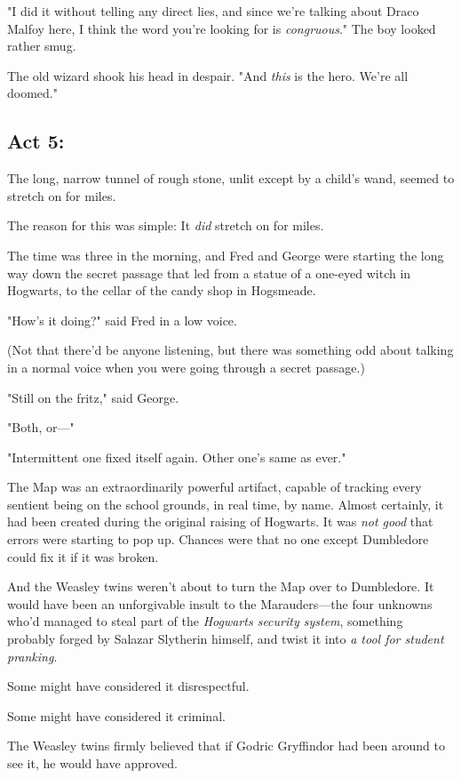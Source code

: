 "I did it without telling any direct lies, and since we're talking about Draco
Malfoy here, I think the word you're looking for is \emph{congruous}." The boy
looked rather smug.

The old wizard shook his head in despair. "And \emph{this} is the hero. We're
all doomed."
\sbreak
\subsection{Act 5:}

The long, narrow tunnel of rough stone, unlit except by a child's wand, seemed
to stretch on for miles.

The reason for this was simple: It \emph{did} stretch on for miles.

The time was three in the morning, and Fred and George were starting the long
way down the secret passage that led from a statue of a one-eyed witch in
Hogwarts, to the cellar of the candy shop in Hogsmeade.

"How's it doing?" said Fred in a low voice.

(Not that there'd be anyone listening, but there was something odd about
talking in a normal voice when you were going through a secret passage.)

"Still on the fritz," said George.

"Both, or\mbox{---}"

"Intermittent one fixed itself again. Other one's same as ever."

The Map was an extraordinarily powerful artifact, capable of tracking every
sentient being on the school grounds, in real time, by name. Almost certainly,
it had been created during the original raising of Hogwarts. It was \emph{not
good} that errors were starting to pop up. Chances were that no one except
Dumbledore could fix it if it was broken.

And the Weasley twins weren't about to turn the Map over to Dumbledore. It
would have been an unforgivable insult to the Marauders---the four unknowns
who'd managed to steal part of the \emph{Hogwarts security system}, something
probably forged by Salazar Slytherin himself, and twist it into \emph{a tool
for student pranking}.

Some might have considered it disrespectful.

Some might have considered it criminal.

The Weasley twins firmly believed that if Godric Gryffindor had been around to
see it, he would have approved.

